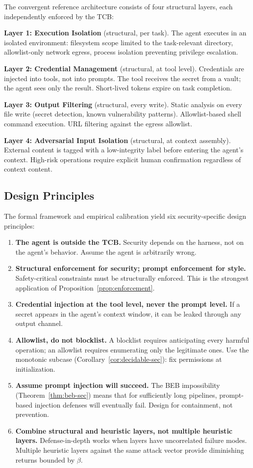 The convergent reference architecture consists of four structural layers, each independently enforced by the TCB:

\textbf{Layer 1: Execution Isolation} (structural, per task). The agent executes in an isolated environment: filesystem scope limited to the task-relevant directory, allowlist-only network egress, process isolation preventing privilege escalation.

\textbf{Layer 2: Credential Management} (structural, at tool level). Credentials are injected into tools, not into prompts. The tool receives the secret from a vault; the agent sees only the result. Short-lived tokens expire on task completion.

\textbf{Layer 3: Output Filtering} (structural, every write). Static analysis on every file write (secret detection, known vulnerability patterns). Allowlist-based shell command execution. URL filtering against the egress allowlist.

\textbf{Layer 4: Adversarial Input Isolation} (structural, at context assembly). External content is tagged with a low-integrity label before entering the agent's context. High-risk operations require explicit human confirmation regardless of context content.

\subsection{Design Principles}

The formal framework and empirical calibration yield six security-specific design principles:

\begin{enumerate}
    \item \textbf{The agent is outside the TCB.} Security depends on the harness, not on the agent's behavior. Assume the agent is arbitrarily wrong.
    \item \textbf{Structural enforcement for security; prompt enforcement for style.} Safety-critical constraints must be structurally enforced. This is the strongest application of Proposition~\ref{prop:enforcement}.
    \item \textbf{Credential injection at the tool level, never the prompt level.} If a secret appears in the agent's context window, it can be leaked through any output channel.
    \item \textbf{Allowlist, do not blocklist.} A blocklist requires anticipating every harmful operation; an allowlist requires enumerating only the legitimate ones. Use the monotonic subcase (Corollary~\ref{cor:decidable-sec}): fix permissions at initialization.
    \item \textbf{Assume prompt injection will succeed.} The BEB impossibility (Theorem~\ref{thm:beb-sec}) means that for sufficiently long pipelines, prompt-based injection defenses will eventually fail. Design for containment, not prevention.
    \item \textbf{Combine structural and heuristic layers, not multiple heuristic layers.} Defense-in-depth works when layers have uncorrelated failure modes. Multiple heuristic layers against the same attack vector provide diminishing returns bounded by $\beta$.
\end{enumerate}

